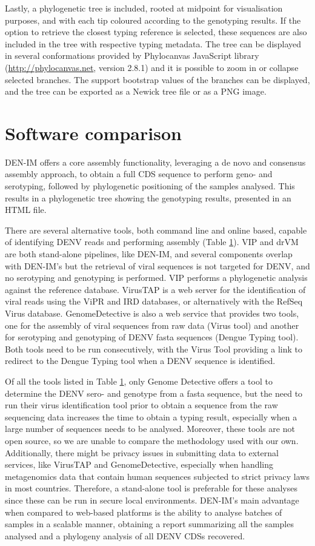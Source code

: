Lastly, a phylogenetic tree is included, rooted at midpoint for visualisation purposes, and with each tip coloured according to the genotyping results. If the option to retrieve the closest typing reference is selected, these sequences are also included in the tree with respective typing metadata. The tree can be displayed in several conformations provided by Phylocanvas JavaScript library (\url{http://phylocanvas.net}, version 2.8.1) and it is possible to zoom in or collapse selected branches. The support bootstrap values of the branches can be displayed, and the tree can be exported as a Newick tree file or as a PNG image.

\section{Software comparison}

DEN-IM offers a core assembly functionality, leveraging a de novo and consensus assembly approach, to obtain a full CDS sequence to perform geno- and serotyping, followed by phylogenetic positioning of the samples analysed. This results in a phylogenetic tree showing the genotyping results, presented in an HTML file.

There are several alternative tools, both command line and online based, capable of identifying DENV reads and performing assembly (Table \ref{}). VIP and drVM are both stand-alone pipelines, like DEN-IM, and several components overlap with DEN-IM’s but the retrieval of viral sequences is not targeted for DENV, and no serotyping and genotyping is performed. VIP performs a phylogenetic analysis against the reference database. VirusTAP is a web server for the identification of viral reads using the ViPR and IRD databases, or alternatively with the RefSeq Virus database. GenomeDetective is also a web service that provides two tools, one for the assembly of viral sequences from raw data (Virus tool) and another for serotyping and genotyping of DENV fasta sequences (Dengue Typing tool). Both tools need to be run consecutively, with the Virus Tool providing a link to redirect to the Dengue Typing tool when a DENV sequence is identified.

Of all the tools listed in Table \ref{}, only Genome Detective offers a tool to determine the DENV sero- and genotype from a fasta sequence, but the need to run their virus identification tool prior to obtain a sequence from the raw sequencing data increases the time to obtain a typing result, especially when a large number of sequences needs to be analysed. Moreover, these tools are not open source, so we are unable to compare the methodology used with our own. Additionally, there might be privacy issues in submitting data to external services, like VirusTAP and GenomeDetective, especially when handling metagenomics data that contain human sequences subjected to strict privacy laws in most countries. Therefore, a stand-alone tool is preferable for these analyses since these can be run in secure local environments. DEN-IM’s main advantage when compared to web-based platforms is the ability to analyse batches of samples in a scalable manner, obtaining a report summarizing all the samples analysed and a phylogeny analysis of all DENV CDSs recovered.